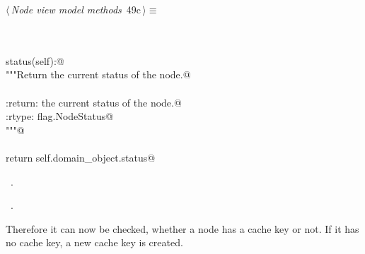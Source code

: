 \documentclass[
    a4paper,      %
    10pt,         %
    openright,    %
    notitlepage,  %
    parskip=half, %
]{scrreprt}       %
\theoremstyle{definition}                    %
\begin{document}
\begin{flushleft} \small
\begin{minipage}{\linewidth}\label{scrap68}\raggedright\small
{} $\langle\,${\itshape Node view model methods}\nobreak\ {\footnotesize {49c}}$\,\rangle\equiv$
\vspace{-1exm}
\begin{list}{}{} \item
\mbox{}\lstinline@@\\
\mbox{}\lstinline@property@\\
\mbox{}\lstinline@def status(self):@\\
\mbox{}\lstinline@    """Return the current status of the node.@\\
\mbox{}\lstinline@@\\
\mbox{}\lstinline@    :return: the current status of the node.@\\
\mbox{}\lstinline@    :rtype: flag.NodeStatus@\\
\mbox{}\lstinline@    """@\\
\mbox{}\lstinline@@\\
\mbox{}\lstinline@    return self.domain_object.status@\\
\mbox{}\lstinline@@{\NWsep}
\end{list}
\vspace{-1.5ex}
\footnotesize
\begin{list}{}{\setlength{\itemsep}{-\parsep}\setlength{\itemindent}{-\leftmargin}}
\item \NWtxtMacroDefBy\ .
\item \NWtxtMacroRefIn\ .

\item{}
\end{list}
\end{minipage}\vspace{4ex}
\end{flushleft}
Therefore it can now be checked, whether a node has a cache key or not. If it
has no cache key, a new cache key is created.
\end{document}
